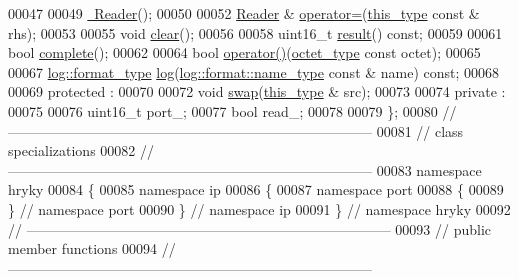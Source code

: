 \begin{DoxyCode}
00047 
00049     \hyperlink{classhryky_1_1ip_1_1port_1_1_reader_a932db1b4fa85ba0114b5a0e7b0d01eb1}{~Reader}();
00050 
00052     \hyperlink{classhryky_1_1ip_1_1port_1_1_reader}{Reader} & \hyperlink{classhryky_1_1ip_1_1port_1_1_reader_a303bdb500ccf0732dd587474ba006f46}{operator=}(\hyperlink{classhryky_1_1ip_1_1port_1_1_reader}{this_type} \textcolor{keyword}{const} & rhs);
00053 
00055     \textcolor{keywordtype}{void} \hyperlink{classhryky_1_1ip_1_1port_1_1_reader_aa0ff8e7089ab6e494191371f743ba010}{clear}();
00056 
00058     uint16\_t \hyperlink{classhryky_1_1ip_1_1port_1_1_reader_a43feefa57670a3764096b009fa5552e4}{result}() \textcolor{keyword}{const};
00059 
00061     \textcolor{keywordtype}{bool} \hyperlink{classhryky_1_1ip_1_1port_1_1_reader_a8419dffbea2a25f10e01ba4f51feccef}{complete}();
00062 
00064     \textcolor{keywordtype}{bool} \hyperlink{classhryky_1_1ip_1_1port_1_1_reader_a64bb586041f1e0d5a16715ed69b9f355}{operator()}(\hyperlink{namespacehryky_a488cba8b666be33ccca70e819684e3c8}{octet_type} \textcolor{keyword}{const} octet);
00065 
00067     \hyperlink{classhryky_1_1_intrusive_ptr}{log::format_type} \hyperlink{classhryky_1_1ip_1_1port_1_1_reader_a698fbd7e25df3dfd69bfdb806f3b8777}{log}(\hyperlink{namespacehryky_1_1log_1_1format_ab7408d1e2ed2d648dbf9bba69eb74288}{log::format::name_type} \textcolor{keyword}{const} & name) \textcolor{keyword}{const};
00068 
00069 \textcolor{keyword}{protected} :
00070 
00072     \textcolor{keywordtype}{void} \hyperlink{classhryky_1_1ip_1_1port_1_1_reader_abc4e0ea972e2ae38ca85a89a3542e998}{swap}(\hyperlink{classhryky_1_1ip_1_1port_1_1_reader}{this_type} & src);
00073 
00074 \textcolor{keyword}{private} :
00075 
00076     uint16\_t    port\_;
00077     \textcolor{keywordtype}{bool}        read\_;
00078 
00079 \};
00080 \textcolor{comment}{//
      ------------------------------------------------------------------------------}
00081 \textcolor{comment}{// class specializations}
00082 \textcolor{comment}{//
      ------------------------------------------------------------------------------}
00083 \textcolor{keyword}{namespace }hryky
00084 \{
00085 \textcolor{keyword}{namespace }ip
00086 \{
00087 \textcolor{keyword}{namespace }port
00088 \{
00089 \} \textcolor{comment}{// namespace port}
00090 \} \textcolor{comment}{// namespace ip}
00091 \} \textcolor{comment}{// namespace hryky}
00092 \textcolor{comment}{//
      ------------------------------------------------------------------------------}
00093 \textcolor{comment}{// public member functions}
00094 \textcolor{comment}{//
      ------------------------------------------------------------------------------}

\end{DoxyCode}
